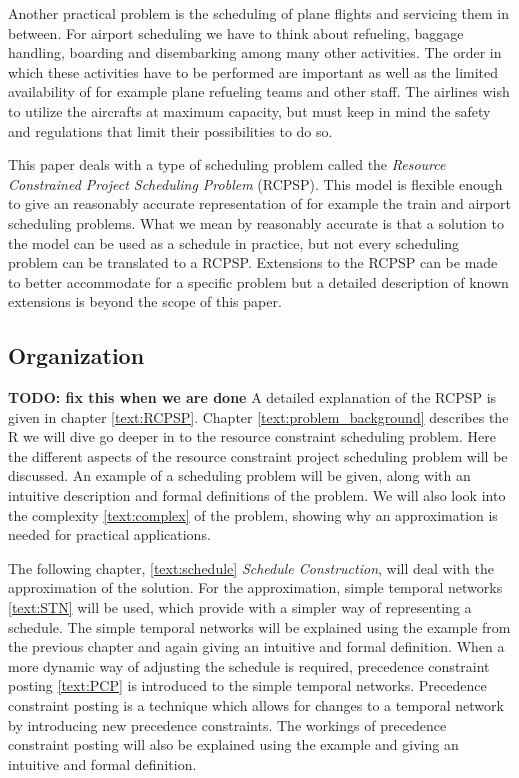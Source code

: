 \documentclass{article}
\theoremstyle{definition}
\newcommand{\TODO}[1]{{\color{red}\textbf{TODO: #1}}}
\begin{document}
Another practical problem is the scheduling of plane flights and servicing them in between. 
For airport scheduling we have to think about refueling, baggage handling, boarding and disembarking among many other activities.
The order in which these activities have to be performed are important as well as the limited availability of for example plane refueling teams and other staff. 
The airlines wish to utilize the aircrafts at maximum capacity, but must keep in mind the safety and regulations that limit their possibilities to do so.

This paper deals with a type of scheduling problem called the \emph{Resource Constrained Project Scheduling Problem} (RCPSP). 
This model is flexible enough to give an reasonably accurate representation of for example the train and airport scheduling problems. 
What we mean by reasonably accurate is that a solution to the model can be used as a schedule in practice, but not every scheduling problem can be translated to a RCPSP.
Extensions to the RCPSP can be made to better accommodate for a specific problem but a detailed description of known extensions is beyond the scope of this paper.

\subsection{Organization}
\TODO{fix this when we are done}
A detailed explanation of the RCPSP is given in chapter \ref{text:RCPSP}. 
Chapter \ref{text:problem_background} describes the R we will dive  go deeper in to the resource constraint scheduling problem.
Here the different aspects of the resource constraint project scheduling problem will be discussed.
An example of a scheduling problem will be given, along with an intuitive description and formal definitions of the problem.
We will also look into the complexity \ref{text:complex} of the problem, showing why an approximation is needed for practical applications.

The following chapter, \ref{text:schedule} \emph{Schedule Construction}, will deal with the approximation of the solution.
For the approximation, simple temporal networks \ref{text:STN} will be used, which provide with a simpler way of representing a schedule.
The simple temporal networks will be explained using the example from the previous chapter and again giving an intuitive and formal definition.
When a more dynamic way of adjusting the schedule is required, precedence constraint posting \ref{text:PCP} is introduced to the simple temporal networks.
Precedence constraint posting is a technique which allows for changes to a temporal network by introducing new precedence constraints.
The workings of precedence constraint posting will also be explained using the example and giving an intuitive and formal definition.
\end{document}
